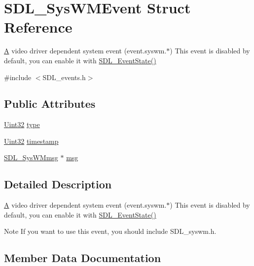 \hypertarget{struct_s_d_l___sys_w_m_event}{}\section{S\+D\+L\+\_\+\+Sys\+W\+M\+Event Struct Reference}
\label{struct_s_d_l___sys_w_m_event}


\mbox{\hyperlink{struct_a}{A}} video driver dependent system event (event.\+syswm.$\ast$) This event is disabled by default, you can enable it with \mbox{\hyperlink{_s_d_l__events_8h_afb772893e1c46f186fa39a4defe76df3}{S\+D\+L\+\_\+\+Event\+State()}}  




{\ttfamily \#include $<$S\+D\+L\+\_\+events.\+h$>$}

\subsection*{Public Attributes}
\begin{DoxyCompactItemize}
\item 
\mbox{\hyperlink{_s_d_l__stdinc_8h_add440eff171ea5f55cb00c4a9ab8672d}{Uint32}} \mbox{\hyperlink{struct_s_d_l___sys_w_m_event_a84697e96cb16bf6a570e10b5bfdcd392}{type}}
\item 
\mbox{\hyperlink{_s_d_l__stdinc_8h_add440eff171ea5f55cb00c4a9ab8672d}{Uint32}} \mbox{\hyperlink{struct_s_d_l___sys_w_m_event_a5d3cb97006d99b620c2671c27bd82c06}{timestamp}}
\item 
\mbox{\hyperlink{struct_s_d_l___sys_w_mmsg}{S\+D\+L\+\_\+\+Sys\+W\+Mmsg}} $\ast$ \mbox{\hyperlink{struct_s_d_l___sys_w_m_event_ad5e3dc68aa15582cd0641847d41c74e8}{msg}}
\end{DoxyCompactItemize}


\subsection{Detailed Description}
\mbox{\hyperlink{struct_a}{A}} video driver dependent system event (event.\+syswm.$\ast$) This event is disabled by default, you can enable it with \mbox{\hyperlink{_s_d_l__events_8h_afb772893e1c46f186fa39a4defe76df3}{S\+D\+L\+\_\+\+Event\+State()}} 

\begin{DoxyNote}{Note}
If you want to use this event, you should include S\+D\+L\+\_\+syswm.\+h. 
\end{DoxyNote}


\subsection{Member Data Documentation}
\mbox{\label{struct_s_d_l___sys_w_m_event_ad5e3dc68aa15582cd0641847d41c74e8}} 

